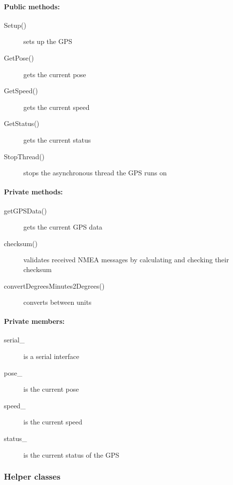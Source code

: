 \paragraph{Public methods:}
\begin{adjustwidth}{2.5em}{0pt}\begin{description}
		\item [Setup()] sets up the GPS
		\item [GetPose()] gets the current pose
		\item [GetSpeed()] gets the current speed
		\item [GetStatus()] gets the current status
		\item [StopThread()] stops the asynchronous thread the GPS runs on
\end{description}\end{adjustwidth}

\paragraph{Private methods:}
\begin{adjustwidth}{2.5em}{0pt}\begin{description}
		\item [getGPSData()] gets the current GPS data
		\item [checksum()] validates received NMEA messages by calculating and checking their checksum
		\item [convertDegreesMinutes2Degrees()] converts between units
\end{description}\end{adjustwidth}

\paragraph{Private members:}
\begin{adjustwidth}{2.5em}{0pt}\begin{description}
		\item [serial_] is a serial interface
		\item [pose_] is the current pose
		\item [speed_] is the current speed
		\item [status_] is the current status of the GPS
\end{description}\end{adjustwidth}

\subsubsection{Helper classes}

